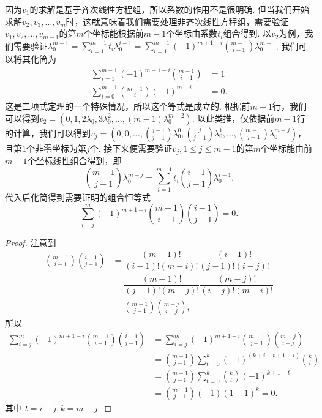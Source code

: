 因为$v_1$的求解是基于齐次线性方程组，所以系数的作用不是很明确. 但当我们开始求解$v_2, v_3, \ldots, v_m$时，这就意味着我们需要处理非齐次线性方程组，需要验证$v_1, v_2, \ldots, v_{m-1}$的第$m$个坐标能根据前$m-1$个坐标由系数$t_i$组合得到. 以$v_2$为例，我们需要验证$\lambda_0^{m-1} = \sum_{i = 1}^{m-1} t_i \lambda_0^{i-1} = \sum_{i = 1}^{m-1} (-1)^{m + 1 - i} \binom{m - 1}{i - 1} \lambda_0^{m - 1}$. 我们可以将其化简为 \begin{align*}
    \sum_{i = 1}^{m-1} (-1)^{m + 1 - i} \binom{m - 1}{i - 1} & = 1 \\
    \sum_{i = 0}^{m-1} \binom{m-1}{i} (-1)^{m - i} & = 0.
\end{align*}
这是二项式定理的一个特殊情况，所以这个等式是成立的. 根据前$m-1$行，我们可以得到$v_2 = (0, 1, 2 \lambda_0, 3 \lambda_0^2, \ldots, (m - 1) \lambda_0^{m - 2})$. 以此类推，仅依据前$m-1$行的计算，我们可以得到$v_j = (0, 0, \ldots, \binom{j - 1}{j - 1} \lambda_0^0, \binom{j}{j - 1} \lambda_0^1, \ldots, \binom{m - 1}{j - 1} \lambda_0^{m - j})$，且第$1$个非零坐标为第$j$个. 接下来便需要验证$v_j, 1 \leqslant j \leqslant m - 1$的第$m$个坐标能由前$m-1$个坐标线性组合得到，即 \[
    \binom{m - 1}{j - 1} \lambda_0^{m - j} = \sum_{i = 1}^{m - 1} t_i \binom{i - 1}{j - 1} \lambda_0^{i - 1}.
\]
代入后化简得到需要证明的组合恒等式 \[
    \sum_{i = j}^m (-1)^{m + 1 - i} \binom{m - 1}{i - 1} \binom{i - 1}{j - 1} = 0.
\]

\begin{proof}
    注意到 \begin{align*}
        \binom{m - 1}{i - 1} \binom{i - 1}{j - 1} & = \dfrac{(m - 1)!}{(i - 1)! (m - i)!} \dfrac{(i - 1)!}{(j - 1)! (i - j)!} \\ & = \dfrac{(m - 1)!}{(j - 1)! (m - j)!} \dfrac{(m - j)!}{(i - j)! (m - i)!} \\ & = \binom{m - 1}{j - 1} \binom{m - j}{i - j},
    \end{align*}
    所以 \begin{align*}
        \sum_{i = j}^m (-1)^{m + 1 - i} \binom{m - 1}{i - 1} \binom{i - 1}{j - 1} & = \sum_{i = j}^m (-1)^{m + 1 - i} \binom{m - 1}{j - 1} \binom{m - j}{i - j} \\
        & = \binom{m - 1}{j - 1} \sum_{t = 0}^k (-1)^(k + i - t  + 1 - i) \binom{k}{t} \\
        & = \binom{m - 1}{j - 1} \sum_{t = 0}^k \binom{k}{t} (-1)^{k + 1 - t} \\
        & = \binom{m - 1}{j - 1} (-1) (1 - 1)^k = 0.
    \end{align*}
    其中 $t = i - j, k = m - j$.
\end{proof}

